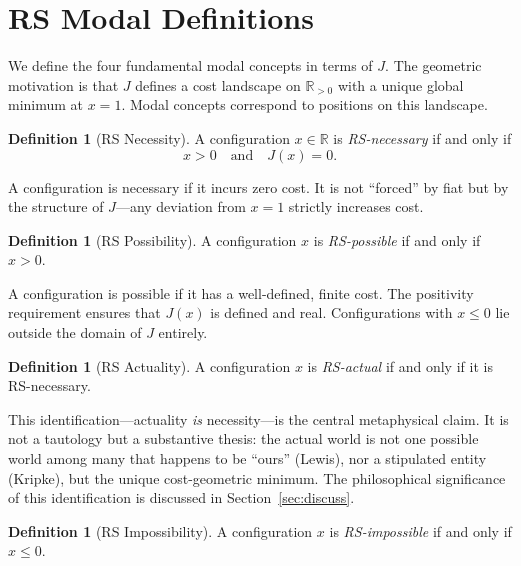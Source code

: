 \documentclass[12pt,a4paper]{article}
\theoremstyle{definition}
\newtheorem{definition}[theorem]{Definition}
\theoremstyle{remark}
\begin{document}
\section{RS Modal Definitions}
\label{sec:defs}

We define the four fundamental modal concepts in terms of $J$.  The
geometric motivation is that $J$ defines a cost landscape on
$\mathbb{R}_{>0}$ with a unique global minimum at $x = 1$.  Modal
concepts correspond to positions on this landscape.

\begin{definition}[RS Necessity]
\label{def:necessary}
A configuration $x \in \mathbb{R}$ is \emph{RS-necessary} if and only if
\begin{equation}
  x > 0 \quad\text{and}\quad J(x) = 0.
\end{equation}
\end{definition}

\noindent
A configuration is necessary if it incurs zero cost.  It is not
``forced'' by fiat but by the structure of $J$---any deviation from
$x = 1$ strictly increases cost.

\begin{definition}[RS Possibility]
\label{def:possible}
A configuration $x$ is \emph{RS-possible} if and only if $x > 0$.
\end{definition}

\noindent
A configuration is possible if it has a well-defined, finite cost.  The
positivity requirement ensures that $J(x)$ is defined and real.
Configurations with $x \leq 0$ lie outside the domain of $J$ entirely.

\begin{definition}[RS Actuality]
\label{def:actual}
A configuration $x$ is \emph{RS-actual} if and only if it is
RS-necessary.
\end{definition}

\noindent
This identification---actuality \emph{is} necessity---is the central
metaphysical claim.  It is not a tautology but a substantive thesis:
the actual world is not one possible world among many that happens to be
``ours'' (Lewis), nor a stipulated entity (Kripke), but the unique
cost-geometric minimum.  The philosophical significance of this
identification is discussed in Section~\ref{sec:discuss}.

\begin{definition}[RS Impossibility]
\label{def:impossible}
A configuration $x$ is \emph{RS-impossible} if and only if $x \leq 0$.
\end{definition}
\end{document}
